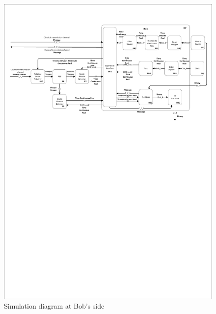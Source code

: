 \begin{enumerate}

\begin{figure}[h]
    \centering
        \includegraphics[clip, trim=0.5cm 17cm 0.5cm 2cm, width=1.00\textwidth]{./sdf/bb84_with_discrete_variables/figures_raw/Simulation_Bob_bb84.pdf}
    \caption{Simulation diagram at Bob's side}\label{bobsimulation}
\end{figure}



\end{enumerate}
